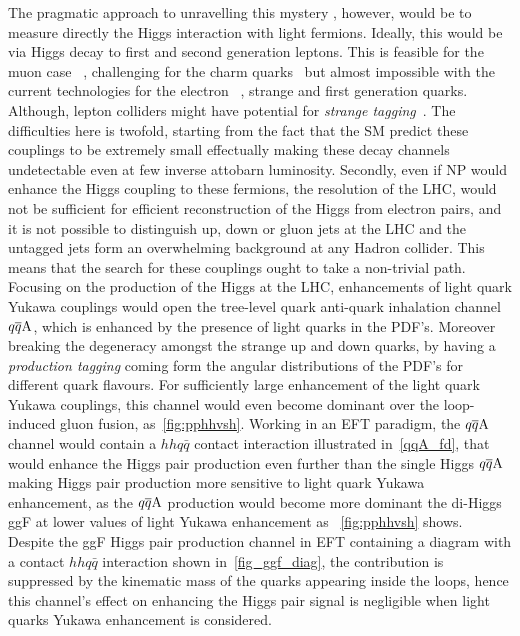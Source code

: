 The pragmatic approach to unravelling this mystery , however, would be to measure directly the Higgs interaction with light fermions. Ideally, this would be via Higgs decay to first and second generation leptons. This is feasible for the muon case ~\cite{ATLAS:2020fzp,CMS:2020xwi}, challenging for the charm quarks~\cite{ATLAS-CONF-2021-021,ATLAS:2022ers,CMS:2019hve} but almost impossible with the current technologies for the electron~ \cite{Khachatryan:2014aep}, strange and first generation quarks. Although, lepton colliders might have potential for \emph{strange tagging}~\cite{Nakai:2020kuu}. The difficulties here is twofold, starting from the fact that the SM predict  these couplings to be extremely small effectually making these decay channels undetectable  even at few inverse attobarn luminosity. Secondly, even if NP would enhance the Higgs coupling to these fermions, the resolution of the LHC, would not be sufficient for efficient reconstruction of the Higgs from electron pairs, and it is not possible to distinguish up, down or gluon jets at the LHC and the untagged jets form an overwhelming background at any Hadron collider. This means that the search for these couplings ought to take a non-trivial path. Focusing on the production of the Higgs at the LHC, enhancements of light quark Yukawa couplings would open the tree-level quark anti-quark inhalation channel $q\overline q \rm A$, which is enhanced  by the presence of light quarks in the PDF's. Moreover breaking the degeneracy amongst the strange up and down quarks, by having a \emph{production tagging} coming form the angular distributions of the PDF's for different quark flavours.  For sufficiently large enhancement of the light quark Yukawa couplings, this channel would even become dominant over the loop-induced gluon fusion, as~\autoref{fig:pphhvsh}. Working in an EFT paradigm, the $q\overline q \rm A$ channel would contain a $hhq\bar q$ contact interaction illustrated in~\autoref{qqA_fd}, that would enhance the Higgs pair production even further than the single Higgs $q\overline q \rm A $ making Higgs pair production more sensitive to light quark Yukawa enhancement, as the $q\overline q \rm A$ production would become more dominant the di-Higgs ggF at lower values of light Yukawa enhancement as ~\autoref{fig:pphhvsh} shows. \\ Despite the ggF Higgs pair production channel in EFT containing a diagram with a contact  $hhq\bar q$  interaction shown in~\autoref{fig_ggf_diag}, the contribution is suppressed by the kinematic mass of the quarks appearing inside the loops, hence this channel's effect on enhancing the Higgs pair signal is negligible when light quarks Yukawa enhancement is considered. \\
